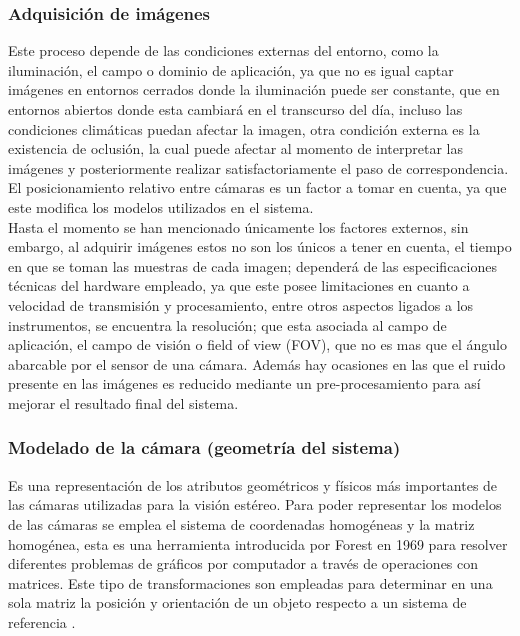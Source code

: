 \subsubsection{Adquisición de imágenes}
Este proceso depende de las condiciones externas del entorno, como la iluminación, el campo o dominio de aplicación, ya que no es igual captar imágenes en entornos cerrados donde la iluminación puede ser constante, que en entornos abiertos donde esta cambiará en el transcurso del día, incluso las condiciones climáticas puedan afectar la imagen, otra condición externa es la existencia de oclusión, la cual puede afectar al momento de interpretar las imágenes y posteriormente realizar satisfactoriamente el paso de correspondencia. El posicionamiento relativo entre cámaras es un factor a tomar en cuenta, ya que este modifica los modelos utilizados en el sistema.
\\
Hasta el momento se han mencionado únicamente los factores externos, sin embargo, al adquirir imágenes estos no son los únicos a tener en cuenta, el tiempo en que se toman las muestras de cada imagen; dependerá de las especificaciones técnicas del hardware empleado, ya que este posee limitaciones en cuanto a velocidad de transmisión y procesamiento, entre otros aspectos ligados a los instrumentos, se encuentra la resolución; que esta asociada al campo de aplicación, el campo de visión o field of view (FOV), que no es mas que el ángulo abarcable por el sensor de una cámara. Además hay ocasiones en las que el ruido presente en las imágenes es  reducido mediante un pre-procesamiento para así mejorar el resultado final del sistema. 
\subsubsection{Modelado de la cámara (geometría del sistema)}
Es una representación de los atributos geométricos y físicos más importantes de las cámaras utilizadas para la visión estéreo. Para poder representar los modelos de las cámaras se emplea el sistema de coordenadas homogéneas y la matriz homogénea, esta es una herramienta introducida por Forest en 1969 para resolver diferentes problemas de gráficos por computador a través de operaciones con matrices. Este tipo de transformaciones son empleadas para determinar en una sola matriz la posición y orientación de un objeto respecto a un sistema de referencia \cite{RSSFernando_homogeneusC}.

